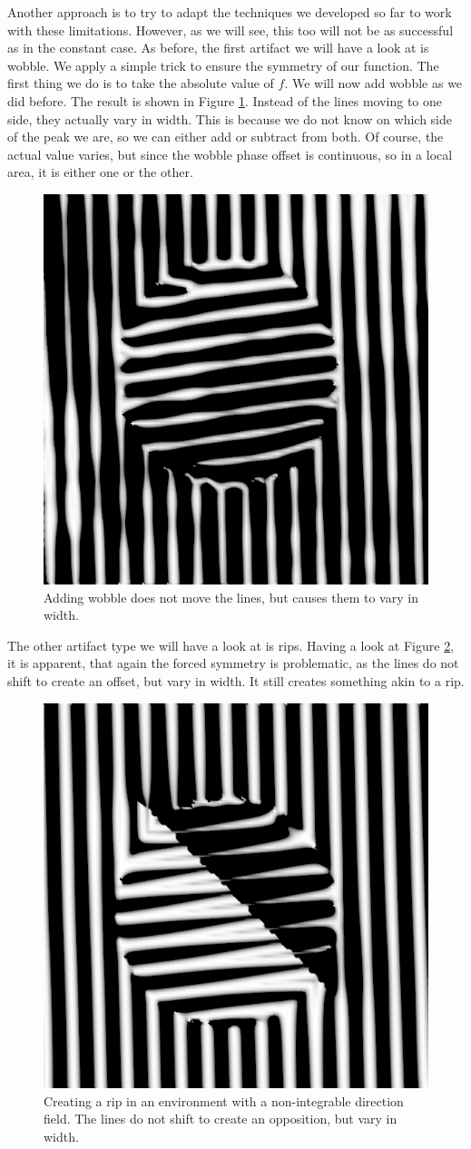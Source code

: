 \documentclass{utue} %
\begin{document}
Another approach is to try to adapt the techniques we developed so far to work with these limitations. However, as we will see, this too will not be as successful as in the constant case. As before, the first artifact we will have a look at is wobble. We apply a simple trick to ensure the symmetry of our function. The first thing we do is to take the absolute value of $f$. We will now add wobble as we did before. The result is shown in Figure \ref{fig:multiDirWobble}. Instead of the lines moving to one side, they actually vary in width. This is because we do not know on which side of the peak we are, so we can either add or subtract from both. Of course, the actual value varies, but since the wobble phase offset is continuous, so in a local area, it is either one or the other.

\begin{figure}[ht]
  \centering
  \includegraphics[width=0.49\linewidth]{images/multiDirWobble}
  \caption{Adding wobble does not move the lines, but causes them to vary in width.}\label{fig:multiDirWobble}
\end{figure}

The other artifact type we will have a look at is rips. Having a look at Figure \ref{fig:multiDirRip}, it is apparent, that again the forced symmetry is problematic, as the lines do not shift to create an offset, but vary in width. It still creates something akin to a rip.

\begin{figure}[ht]
  \centering
  \includegraphics[width=0.49\linewidth]{images/multiDirRip}
  \caption{Creating a rip in an environment with a non-integrable direction field. The lines do not shift to create an opposition, but vary in width.}\label{fig:multiDirRip}
\end{figure}
\end{document}
